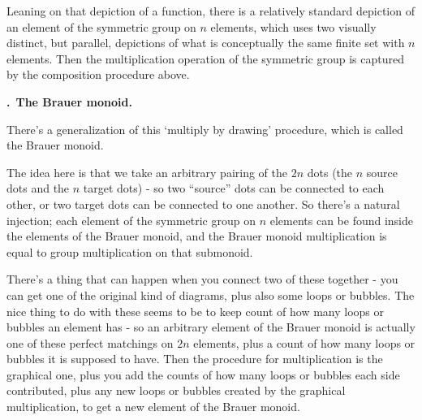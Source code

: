 \documentclass[11pt,noamsfonts]{amsart}
\newcommand{\pointheader}{\vspace{2mm}\noindent\refstepcounter{section}\textbf{\thesection.}}
\newcommand{\bpoint}[1]{\pointheader~{\bf #1.}}
\begin{document}
Leaning on that depiction of a function, there is a relatively standard depiction of an element of the symmetric group on \(n\) elements, which uses two visually distinct, but parallel, depictions of what is conceptually the same finite set with \(n\) elements. Then the multiplication operation of the symmetric group is captured by the composition procedure above.


\bpoint{The Brauer monoid}

There's a generalization of this `multiply by drawing' procedure, which is called the Brauer monoid.

The idea here is that we take an arbitrary pairing of the \(2 n\) dots (the \(n\) source dots and the \(n\) target dots) - so two ``source'' dots can be connected to each other, or two target dots can be connected to one another. So there's a natural injection; each element of the symmetric group on \(n\) elements can be found inside the elements of the Brauer monoid, and the Brauer monoid multiplication is equal to group multiplication on that submonoid.

There's a thing that can happen when you connect two of these together - you can get one of the original kind of diagrams, plus also some loops or bubbles. The nice thing to do with these seems to be to keep count of how many loops or bubbles an element has - so an arbitrary element of the Brauer monoid is actually one of these perfect matchings on \(2 n\) elements, plus a count of how many loops or bubbles it is supposed to have. Then the procedure for multiplication is the graphical one, plus you add the counts of how many loops or bubbles each side contributed, plus any new loops or bubbles created by the graphical multiplication, to get a new element of the Brauer monoid.
\end{document}
